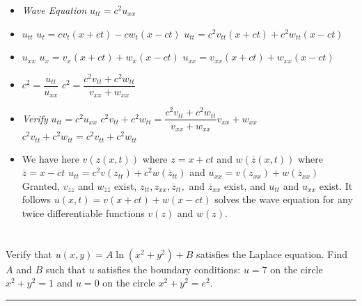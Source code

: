 \documentclass[10pt]{article}
\begin{document}
\begin{itemize}
    \item \textit{Wave Equation} $ u_{tt} = c^2u_{xx} $
    \item $ u_{tt} $
    \subitem $ u_{t} = cv_{t}(x+ct) - cw_{t}(x-ct) $
    \subitem $ u_{tt} = c^2v_{tt}(x+ct) + c^2w_{tt}(x-ct) $
    \item $ u_{xx} $
    \subitem $ u_{x} = v_{x}(x+ct) + w_{x}(x-ct) $
    \subitem $ u_{xx} = v_{xx}(x+ct) + w_{xx}(x-ct) $
    \item $ \displaystyle c^2 = \dfrac{u_{tt}}{u_{xx}} $
    \subitem $ \displaystyle c^2 = \dfrac{c^2v_{tt} + c^2w_{tt}}{v_{xx} + w_{xx}} $ 
    \item \textit{Verify} $ u_{tt} = c^2u_{xx} $
    \subitem $ \displaystyle c^2v_{tt} + c^2w_{tt} = \dfrac{c^2v_{tt} + c^2w_{tt}}{v_{xx} + w_{xx}}v_{xx} + w_{xx} $
    \subitem $ c^2v_{tt} + c^2w_{tt} = c^2v_{tt} + c^2w_{tt} $
    \item We have here $ v(z(x,t)) $ where $ z = x + ct $ and $ w(\overline{z}(x,t)) $ where $ \overline{z} = x - ct $
    \subitem $ u_{tt} = c^2v(z_{tt}) + c^2w(\overline{z}_{tt}) $ and $ u_{xx} = v(z_{xx}) + w(\overline{z}_{xx}) $
    \subitem Granted, $ v_{zz} $ and $ w_{\overline{z}\overline{z}} $ exist, $ z_{tt}, z_{xx}, \overline{z}_{tt}, $ and $ \overline{z}_{xx} $ exist, and $ u_{tt} $ and $ u_{xx} $ exist.
    \subitem It follows $ u(x,t) = v(x+ct) + w(x-ct) $ solves the wave equation for any twice differentiable functions $ v(z) $ and $ w(z) $.
\end{itemize}

\newpage

\section{\underline{}}
\label{sec: Problem 4}

\noindent
Verify that $ u(x,y) = A\ln{(x^2 + y^2)} + B $ satisfies the Laplace equation. 
Find $ A $ and $ B $ such that $ u $ satisfies the boundary conditions: $ u = 7 $ on the circle $ x^2 + y^2 = 1 $ and $ u = 0 $ on the circle $ x^2 + y^2 = e^2 $.  \\
\vspace{2.5mm}

\hrule 

\vspace{7.5mm}
\end{document}
